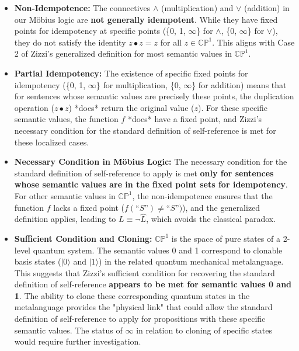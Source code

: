 	\begin{itemize}
		\item \textbf{Non-Idempotence:} The connectives \(\wedge\) (multiplication) and \(\vee\) (addition) in our M\"{o}bius logic are \textbf{not generally idempotent}. While they have fixed points for idempotency at specific points (\{0, 1, \(\infty\)\} for \(\wedge\), \{0, \(\infty\)\} for \(\vee\)), they do not satisfy the identity \(z \bullet z = z\) for all \(z \in \mathbb{CP}^1\). This aligns with Case 2 of Zizzi's generalized definition for most semantic values in \(\mathbb{CP}^1\).
		
		\item \textbf{Partial Idempotency:} The existence of specific fixed points for idempotency (\{0, 1, \(\infty\)\} for multiplication, \{0, \(\infty\)\} for addition) means that for sentences whose semantic values are precisely these points, the duplication operation (\(z \bullet z\)) *does* return the original value (\(z\)). For these specific semantic values, the function \(f\) *does* have a fixed point, and Zizzi's necessary condition for the standard definition of self-reference is met for these localized cases.
		
		\item \textbf{Necessary Condition in Möbius Logic:} The necessary condition for the standard definition of self-reference to apply is met \textbf{only for sentences whose semantic values are in the fixed point sets for idempotency}. For other semantic values in \(\mathbb{CP}^1\), the non-idempotence ensures that the function \(f\) lacks a fixed point (\(f(\text{``}S\text{''}) \neq \text{``}S\text{''})\)), and the generalized definition applies, leading to \(L \equiv \neg \widehat{L}\), which avoids the classical paradox.
		
		\item \textbf{Sufficient Condition and Cloning:} \(\mathbb{CP}^1\) is the space of pure states of a 2-level quantum system. The semantic values 0 and 1 correspond to clonable basis states (\(|0\rangle\) and \(|1\rangle\)) in the related quantum mechanical metalanguage. This suggests that Zizzi's sufficient condition for recovering the standard definition of self-reference \textbf{appears to be met for semantic values 0 and 1}. The ability to clone these corresponding quantum states in the metalanguage provides the "physical link" that could allow the standard definition of self-reference to apply for propositions with these specific semantic values. The status of \(\infty\) in relation to cloning of specific states would require further investigation.
	\end{itemize}
	
